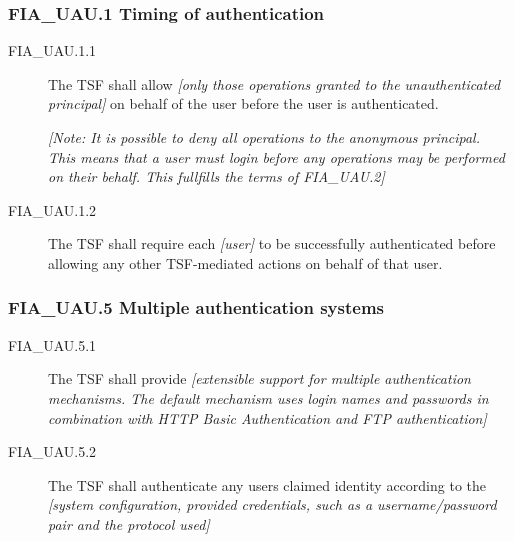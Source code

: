 \documentclass[10pt,a4paper,english]{article}
\begin{document}
\hypertarget{fia-uau-1-timing-of-authentication}{}
\subsubsection*{FIA{\_}UAU.1 Timing of authentication}
\begin{description}
\item[FIA{\_}UAU.1.1 ]

The TSF shall allow \emph{{[}only those operations granted to the
unauthenticated principal]} on behalf of the user before the user is
authenticated.

\emph{{[}Note: It is possible to deny all operations to the anonymous
principal. This means that a user must login before any operations may
be performed on their behalf. This fullfills the terms of FIA{\_}UAU.2]}

\item[FIA{\_}UAU.1.2 ]

The TSF shall require each \emph{{[}user]} to be successfully
authenticated before allowing any other TSF-mediated actions on behalf
of that user.

\end{description}



\hypertarget{fia-uau-5-multiple-authentication-systems}{}
\subsubsection*{FIA{\_}UAU.5 Multiple authentication systems}
\begin{description}
\item[FIA{\_}UAU.5.1 ]

The TSF shall provide \emph{{[}extensible support for multiple
authentication mechanisms. The default mechanism uses login names
and passwords in combination with HTTP Basic Authentication and FTP
authentication]}

\item[FIA{\_}UAU.5.2]

The TSF shall authenticate any users claimed identity according to
the \emph{{[}system configuration, provided credentials, such as a
username/password pair and the protocol used]}

\end{description}
\end{document}
